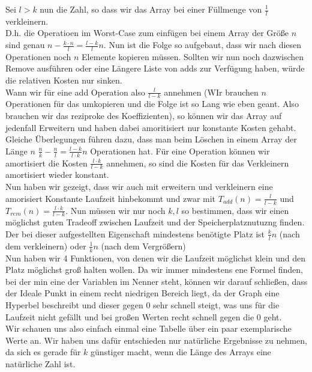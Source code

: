 \documentclass[11pt,a4paper,ngerman]{article}
\begin{document}
\begin{enumerate}[\bfseries a)]
Sei $l>k$ nun die Zahl, so dass wir das Array bei einer Füllmenge von $\frac{1}{l}$ verkleinern.\\
D.h. die Operatioen im Worst-Case zum einfügen bei einem Array der Größe $n$ sind genau $n - \frac{k\cdot n}{l} = \frac{l-k}{l} n$. Nun ist die Folge so aufgebaut, dass wir nach diesen Operationen noch $n$ Elemente kopieren müssen. Sollten wir nun noch dazwischen Remove ausführen oder eine Längere Liste von adds zur Verfügung haben, würde die relativen Kosten nur sinken.\\
Wann wir für eine add Operation also $\frac{l}{l-k}$ annehmen (WIr brauchen $n$ Operationen für das umkopieren und die Folge ist so Lang wie eben geant. Also brauchen wir das reziproke des Koeffizienten), so können wir das Array auf jedenfall Erweitern und haben dabei amoritisiert nur konstante Kosten gehabt.\\

Gleiche Überlegungen führen dazu, dass man beim Löschen in einem Array der Länge $n$ $\frac{n}{k} - \frac{n}{l} = \frac{l-k}{l \cdot k} n$ Operationen hat. Für eine Operation können wir amortisiert die Kosten $\frac{l \cdot k}{l-k}$ annehmen, so sind die Kosten für das Verkleinern amortisiert wieder konstant.\\

Nun haben wir gezeigt, dass wir auch mit erweitern und verkleinern eine amorisiert Konstante Laufzeit hinbekommt und zwar mit $T_{add}(n)= \frac{l}{l-k}$ und $T_{rem}(n) = \frac{l \cdot k}{l-k}$. Nun müssen wir nur noch $k,l$ so bestimmen, dass wir einen möglichst guten Tradeoff zwischen Laufzeit und der Speicherplatznutuzng finden. Der bei dieser aufgestellten Eigenschaft mindestens benötigte Platz ist $\frac{k}{l}n$ (nach dem verkleinern)  oder $\frac{1}{k}n$ (nach dem Vergrößern)\\

Nun haben wir 4 Funktionen, von denen wir die Laufzeit möglichst klein und den Platz möglichst groß halten wollen. Da wir immer mindestens ene Formel finden, bei der min eine der Variablen im Nenner steht, können wir darauf schließen, dass der Ideale Punkt in einem recht niedrigen Bereich  liegt, da der Graph eine Hyperbel beschreibt und dieser gegen 0 sehr schnell steigt, was uns für die Laufzeit nicht gefällt und bei großen Werten recht schnell gegen die 0 geht.\\

Wir schauen uns also einfach einmal eine Tabelle über ein paar exemplarische Werte an. Wir haben uns dafür entschieden nur natürliche Ergebnisse zu nehmen, da sich es gerade für $k$ günstiger macht, wenn die Länge des Arrays eine natürliche Zahl ist.\\


\end{enumerate}
\end{document}
